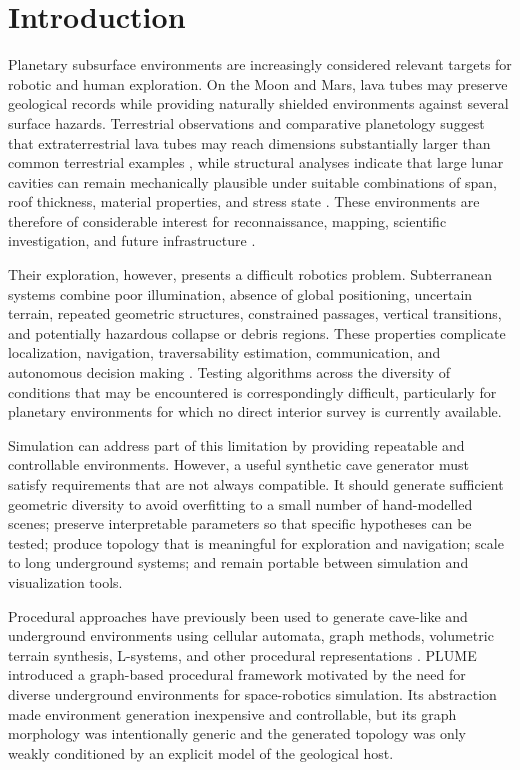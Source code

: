 \documentclass[conference]{IEEEtran}
\begin{document}
\section{Introduction}

Planetary subsurface environments are increasingly considered relevant targets for robotic and human exploration. On the Moon and Mars, lava tubes may preserve geological records while providing naturally shielded environments against several surface hazards. Terrestrial observations and comparative planetology suggest that extraterrestrial lava tubes may reach dimensions substantially larger than common terrestrial examples \cite{sauro2020}, while structural analyses indicate that large lunar cavities can remain mechanically plausible under suitable combinations of span, roof thickness, material properties, and stress state \cite{blair2017,chwala2024}. These environments are therefore of considerable interest for reconnaissance, mapping, scientific investigation, and future infrastructure \cite{feng2024,daedalus2021}.

Their exploration, however, presents a difficult robotics problem. Subterranean systems combine poor illumination, absence of global positioning, uncertain terrain, repeated geometric structures, constrained passages, vertical transitions, and potentially hazardous collapse or debris regions. These properties complicate localization, navigation, traversability estimation, communication, and autonomous decision making \cite{cano_navigation}. Testing algorithms across the diversity of conditions that may be encountered is correspondingly difficult, particularly for planetary environments for which no direct interior survey is currently available.

Simulation can address part of this limitation by providing repeatable and controllable environments. However, a useful synthetic cave generator must satisfy requirements that are not always compatible. It should generate sufficient geometric diversity to avoid overfitting to a small number of hand-modelled scenes; preserve interpretable parameters so that specific hypotheses can be tested; produce topology that is meaningful for exploration and navigation; scale to long underground systems; and remain portable between simulation and visualization tools.

Procedural approaches have previously been used to generate cave-like and underground environments using cellular automata, graph methods, volumetric terrain synthesis, L-systems, and other procedural representations \cite{johnson2010,santamaria2014,antoniuk2016,paris2021,cano_gazebo}. PLUME \cite{plume2025} introduced a graph-based procedural framework motivated by the need for diverse underground environments for space-robotics simulation. Its abstraction made environment generation inexpensive and controllable, but its graph morphology was intentionally generic and the generated topology was only weakly conditioned by an explicit model of the geological host.
\end{document}
